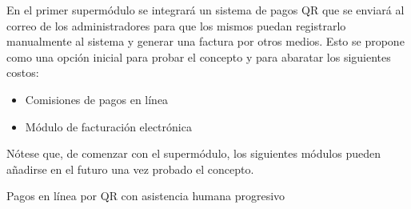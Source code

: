 En el primer supermódulo se integrará un sistema de pagos QR que se enviará al correo de los administradores para que los mismos puedan registrarlo manualmente al sistema y generar una factura por otros medios. Esto se propone como una opción inicial para probar el concepto y para abaratar los siguientes costos:

\begin{itemize}
    \item Comisiones de pagos en línea
    \item Módulo de facturación electrónica
\end{itemize}

Nótese que, de comenzar con el supermódulo, los siguientes módulos pueden añadirse en el futuro una vez probado el concepto.

Pagos en línea por QR con asistencia humana progresivo